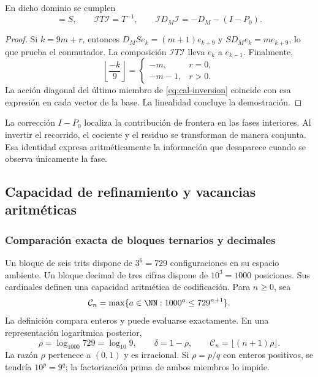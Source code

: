 \begin{proposicion}
En dicho dominio se cumplen
\begin{equation}
 [D_M,S]=S,\qquad
 \mathcal IT\mathcal I=T^{-1},\qquad
 \mathcal ID_M\mathcal I=-D_M-(I-P_0).
 \label{eq:cal-inversion}
\end{equation}
\end{proposicion}
\begin{proof}
Si $k=9m+r$, entonces
$D_MS e_k=(m+1)e_{k+9}$ y $SD_Me_k=me_{k+9}$, lo que prueba
el conmutador. La composición $\mathcal IT\mathcal I$ lleva
$e_k$ a $e_{k-1}$. Finalmente,
\[
 \left\lfloor\frac{-k}9\right\rfloor
 =\begin{cases}-m,&r=0,\\-m-1,&r>0.\end{cases}
\]
La acción diagonal del último miembro de \eqref{eq:cal-inversion}
coincide con esa expresión en cada vector de la base. La linealidad
concluye la demostración.
\end{proof}

La corrección $I-P_0$ localiza la contribución de frontera en las fases
interiores. Al invertir el recorrido, el cociente y el residuo se
transforman de manera conjunta. Esa identidad expresa aritméticamente
la información que desaparece cuando se observa únicamente la fase.

\subsection{Capacidad de refinamiento y vacancias aritméticas}

\subsubsection{Comparación exacta de bloques ternarios y decimales}

Un bloque de seis trits dispone de $3^6=729$ configuraciones en su
espacio ambiente. Un bloque decimal de tres cifras dispone de $10^3=1000$
posiciones. Sus cardinales definen una capacidad aritmética de
codificación. Para $n\geq0$, sea
\begin{equation}
 \mathcal C_n=\max\{a\in\NN:1000^a\leq729^{n+1}\}.
 \label{eq:cal-capacidad-entera}
\end{equation}
La definición compara enteros y puede evaluarse exactamente. En una
representación logarítmica posterior,
\[
 \rho=\log_{1000}729=\log_{10}9,\qquad
 \delta=1-\rho,\qquad
 \mathcal C_n=\lfloor(n+1)\rho\rfloor.
\]
La razón $\rho$ pertenece a $(0,1)$ y es irracional. Si
$\rho=p/q$ con enteros positivos, se tendría $10^p=9^q$;
la factorización prima de ambos miembros lo impide.

